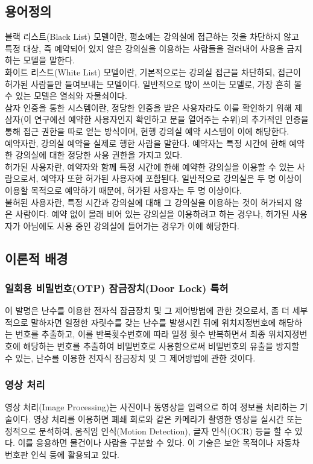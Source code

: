\documentclass[11pt,a4paper]{article}
\begin{document}
\subsection{용어정의}
블랙 리스트(Black List) 모델이란, 평소에는 강의실에 접근하는 것을 차단하지 않고 특정 대상, 즉 예약되어 있지 않은 강의실을 이용하는 사람들을 걸러내어 사용을 금지하는 모델을 말한다.\\
화이트 리스트(White List) 모델이란, 기본적으로는 강의실 접근을 차단하되, 접근이 허가된 사람들만 들여보내는 모델이다. 일반적으로 많이 쓰이는 모델로, 가장 흔히 볼 수 있는 모델은 열쇠와 자물쇠이다.\\
삼자 인증을 통한 시스템이란, 정당한 인증을 받은 사용자라도 이를 확인하기 위해 제삼자(이 연구에선 예약한 사용자인지 확인하고 문을 열어주는 수위)의 추가적인 인증을 통해 접근 권한을 따로 얻는 방식이며, 현행 강의실 예약 시스템이 이에 해당한다.\\
예약자란, 강의실 예약을 실제로 행한 사람을 말한다. 예약자는 특정 시간에 한해 예약한 강의실에 대한 정당한 사용 권한을 가지고 있다.\\
허가된 사용자란, 예약자와 함께 특정 시간에 한해 예약한 강의실을 이용할 수 있는 사람으로서, 예약자 또한 허가된 사용자에 포함된다. 일반적으로 강의실은 두 명 이상이 이용할 목적으로 예약하기 때문에, 허가된 사용자는 두 명 이상이다.\\
불허된 사용자란, 특정 시간과 강의실에 대해 그 강의실을 이용하는 것이 허가되지 않은 사람이다. 예약 없이 몰래 비어 있는 강의실을 이용하려고 하는 경우나, 허가된 사용자가 아님에도 사용 중인 강의실에 들어가는 경우가 이에 해당한다.

\subsection{이론적 배경}

\subsubsection{일회용 비밀번호(OTP) 잠금장치(Door Lock) 특허}
이 발명은 난수를 이용한 전자식 잠금장치 및 그 제어방법에 관한 것으로서, 좀 더 세부적으로 말하자면 일정한 자릿수를 갖는 난수를 발생시킨 뒤에 위치지정번호에 해당하는 번호를 추출하고, 이를 반복횟수번호에 따라 일정 횟수 반복하면서 최종 위치지정번호에 해당하는 번호를 추출하여 비밀번호로 사용함으로써 비밀번호의 유출을 방지할 수 있는, 난수를 이용한 전자식 잠금장치 및 그 제어방법에 관한 것이다.

\subsubsection{영상 처리}
영상 처리(Image Processing)는 사진이나 동영상을 입력으로 하여 정보를 처리하는 기술이다. 영상 처리를 이용하면 폐쇄 회로와 같은 카메라가 촬영한 영상을 실시간 또는 정적으로 분석하여, 움직임 인식(Motion Detection), 글자 인식(OCR) 등을 할 수 있다. 이를 응용하면 물건이나 사람을 구분할 수 있다. 이 기술은 보안 목적이나 자동차 번호판 인식 등에 활용되고 있다.
\end{document}

